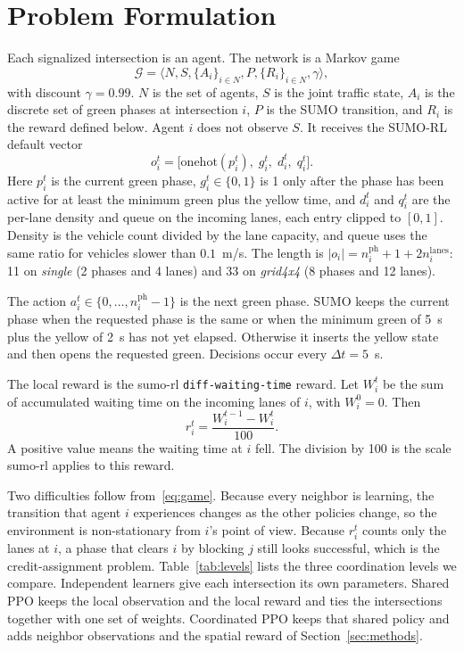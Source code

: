 \documentclass[conference]{IEEEtran}
\begin{document}
\section{Problem Formulation}
\label{sec:problem}
Each signalized intersection is an agent. The network is a Markov game
\begin{equation}
\mathcal{G} = \langle N, S, \{A_i\}_{i \in N}, P, \{R_i\}_{i \in N}, \gamma \rangle,
\label{eq:game}
\end{equation}
with discount $\gamma = 0.99$. $N$ is the set of agents, $S$ is the joint traffic state, $A_i$ is the discrete set of green phases at intersection $i$, $P$ is the SUMO transition, and $R_i$ is the reward defined below. Agent $i$ does not observe $S$. It receives the SUMO-RL default vector
\begin{equation}
o_i^t = \big[ \mathrm{onehot}(p_i^t),\; g_i^t,\; d_i^t,\; q_i^t \big].
\label{eq:obs}
\end{equation}
Here $p_i^t$ is the current green phase, $g_i^t \in \{0,1\}$ is 1 only after the phase has been active for at least the minimum green plus the yellow time, and $d_i^t$ and $q_i^t$ are the per-lane density and queue on the incoming lanes, each entry clipped to $[0,1]$. Density is the vehicle count divided by the lane capacity, and queue uses the same ratio for vehicles slower than $0.1$~m/s. The length is $|o_i| = n_i^{\mathrm{ph}} + 1 + 2 n_i^{\mathrm{lanes}}$: 11 on \emph{single} (2 phases and 4 lanes) and 33 on \emph{grid4x4} (8 phases and 12 lanes).

The action $a_i^t \in \{0,\ldots,n_i^{\mathrm{ph}}-1\}$ is the next green phase. SUMO keeps the current phase when the requested phase is the same or when the minimum green of 5~s plus the yellow of 2~s has not yet elapsed. Otherwise it inserts the yellow state and then opens the requested green. Decisions occur every $\Delta t = 5$~s.

The local reward is the sumo-rl \texttt{diff-waiting-time} reward. Let $W_i^t$ be the sum of accumulated waiting time on the incoming lanes of $i$, with $W_i^0 = 0$. Then
\begin{equation}
r_i^t = \frac{W_i^{t-1} - W_i^t}{100}.
\label{eq:reward}
\end{equation}
A positive value means the waiting time at $i$ fell. The division by 100 is the scale sumo-rl applies to this reward.

Two difficulties follow from~\eqref{eq:game}. Because every neighbor is learning, the transition that agent $i$ experiences changes as the other policies change, so the environment is non-stationary from $i$'s point of view. Because $r_i^t$ counts only the lanes at $i$, a phase that clears $i$ by blocking $j$ still looks successful, which is the credit-assignment problem. Table~\ref{tab:levels} lists the three coordination levels we compare. Independent learners give each intersection its own parameters. Shared PPO keeps the local observation and the local reward and ties the intersections together with one set of weights. Coordinated PPO keeps that shared policy and adds neighbor observations and the spatial reward of Section~\ref{sec:methods}.
\end{document}
